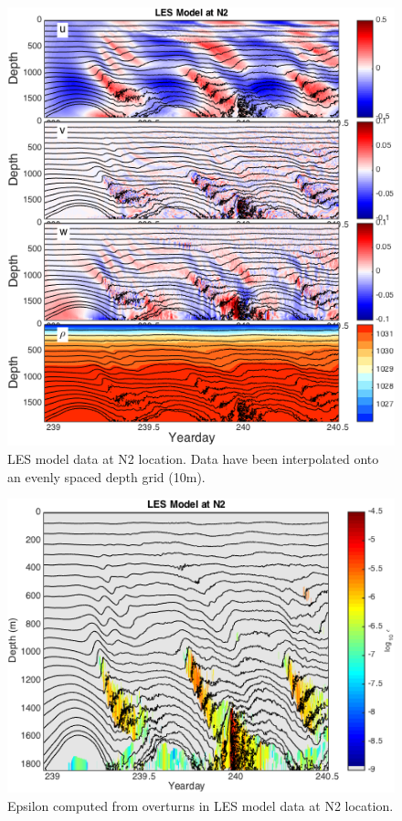 \documentclass[11pt]{article}
\begin{document}
\begin{figure}[htbp]
\includegraphics[scale=0.8]{LES_N2_summary.png}
\caption{LES model data at N2 location. Data have been interpolated onto an evenly spaced depth grid (10m).}
\label{}
\end{figure}

\begin{figure}[htbp]
\includegraphics[scale=0.8]{LES_N2_OTeps.png}
\caption{Epsilon computed from overturns in LES model data at N2 location.}
\label{}
\end{figure}
\end{document}

